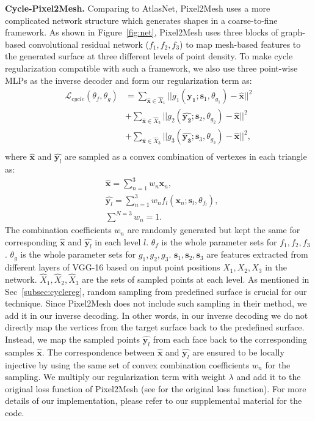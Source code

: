 \noindent\textbf{Cycle-Pixel2Mesh.}
Comparing to AtlasNet, Pixel2Mesh uses a more complicated network structure which generates shapes in a coarse-to-fine framework. As shown in Figure~\ref{fig:net}, Pixel2Mesh uses three blocks of graph-based convolutional residual network ($f_1,f_2,f_3$) to map mesh-based features to the generated surface at three different levels of point density. To make cycle regularization compatible with such a framework, we also use three point-wise MLPs as the inverse decoder and form our regularization term as:
\begin{equation}
\begin{aligned}
\mathcal{L}_{cycle}(\theta_f,\theta_g) 
&= \sum_{\hat{\mathbf{x}} \in \hat{X}_1}||g_{1}(\hat{\mathbf{y_1}};\mathbf{s}_1,\theta_{g_1}) - \hat{\mathbf{x}}||^2\\
&+ \sum_{\hat{\mathbf{x}} \in \hat{X}_2}||g_{2}(\hat{\mathbf{y_2}};\mathbf{s}_2,\theta_{g_2}) - \hat{\mathbf{x}}||^2\\
&+ \sum_{\hat{\mathbf{x}} \in \hat{X}_3}||g_{3}(\hat{\mathbf{y_3}};\mathbf{s}_3,\theta_{g_3}) - \hat{\mathbf{x}}||^2,\\
\end{aligned}
\end{equation}
where $\hat{\mathbf{x}}$ and $\hat{\mathbf{y}_l}$ are sampled as a convex combination of vertexes in each triangle as:
\begin{equation}
\begin{aligned}
\label{equ:sample}
&\hat{\mathbf{x}} = \sum^{3}_{n=1} w_n\mathbf{x}_n, \\
&\hat{\mathbf{y}_l} = \sum^{3}_{n=1} w_nf_l(\mathbf{x}_n;\mathbf{s}_l,\theta_{f_l}),\\
&\sum^{N=3} w_n = 1.
\end{aligned}
\end{equation}
The combination coefficients $w_n$ are randomly generated but kept the same for corresponding $\hat{\mathbf{x}}$ and $\hat{\mathbf{y}_l}$ in each level $l$. $\theta_f$ is the whole parameter sets for $f_1,f_2,f_3$. $\theta_g$ is the whole parameter sets for $g_1,g_2,g_3$. $\mathbf{s}_1,\mathbf{s}_2,\mathbf{s}_3$ are features extracted from different layers of VGG-16 based on input point positions $X_1,X_2,X_3$ in the network. $\hat{X}_1,\hat{X}_2,\hat{X}_3$ are the sets of sampled points at each level.
As mentioned in Sec~\ref{subsec:cyclereg}, random sampling from predefined surface is crucial for our technique. Since Pixel2Mesh does not include such sampling in their method, we add it in our inverse decoding. In other words, in our inverse decoding we do not directly map the vertices from the target surface back to the predefined surface. Instead, we map the sampled points $\hat{\mathbf{y}_l}$ from each face back to the corresponding samples $\hat{\mathbf{x}}$. The correspondence between $\hat{\mathbf{x}}$ and $\hat{\mathbf{y}_l}$ are ensured to be locally injective by using the same set of convex combination coefficients $w_n$ for the sampling. We multiply our regularization term with weight $\lambda$ and add it to the original loss function of Pixel2Mesh (see \cite{pixel2mesh} for the original loss function). For more details of our implementation, please refer to our supplemental material for the code.
